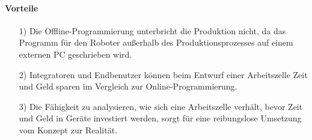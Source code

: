 \documentclass[14pt,a4paper,titlepage]{article}
\begin{document}
	\paragraph*{Vorteile}
	\begin{itemize}
		\item [1)]
		Die Offline-Programmierung unterbricht die Produktion nicht, da das Programm für den Roboter außerhalb des Produktionsprozesses auf einem externen PC geschrieben wird.
		\item[2)]
		Integratoren und Endbenutzer können beim Entwurf einer Arbeitszelle Zeit und Geld sparen im Vergleich zur Online-Programmierung.
		\item[3)]
		Die Fähigkeit zu analysieren, wie sich eine Arbeitszelle verhält, bevor Zeit und Geld in Geräte investiert werden, sorgt für eine reibungslose Umsetzung vom Konzept zur Realität.
	\end{itemize}
\end{document}
